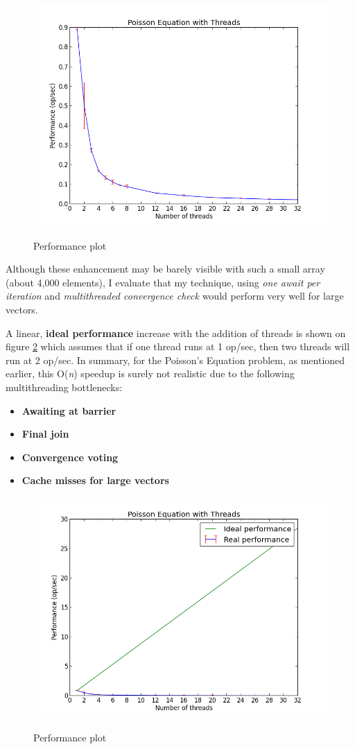 \documentclass{article}
\begin{document}
\begin{figure}
  \centering
  \caption{Performance plot}
  \includegraphics[width=0.8\linewidth, natwidth=800, natheight=600]{graphs/performance.png}
  \label{fig:perf}
\end{figure}

Although these enhancement may be barely visible with such a small array (about 4,000 elements), I evaluate that my technique, using \textit{one await per iteration} and \textit{multithreaded convergence check} would perform very well for large vectors.

A linear, \textbf{ideal performance} increase with the addition of threads is shown on figure \ref{fig:ideal-perf} which assumes that if one thread runs at 1 op/sec, then two threads will run at 2 op/sec. In summary, for the Poisson's Equation problem, as mentioned earlier, this O(\textit{n}) speedup is surely not realistic due to the following multithreading bottlenecks:

\begin{itemize}
\setlength\itemsep{0.35em}
  \item \textbf{Awaiting at barrier}
  \item \textbf{Final join}
  \item \textbf{Convergence voting}
  \item \textbf{Cache misses for large vectors}
\end{itemize}

\begin{figure}
  \centering
  \caption{Performance plot}
  \includegraphics[width=0.8\linewidth, natwidth=800, natheight=600]{graphs/ideal_performance.png}
  \label{fig:ideal-perf}
\end{figure}
\end{document}
